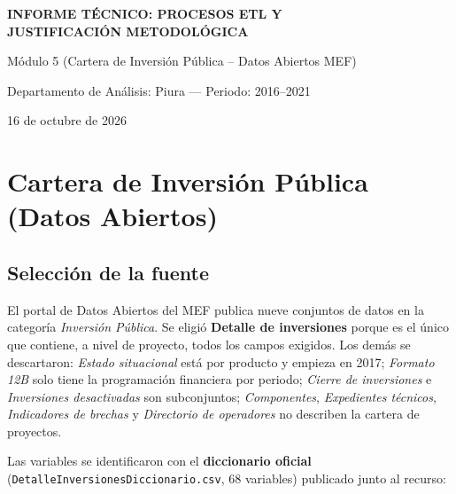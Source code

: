 \documentclass[12pt,a4paper]{article}
\newcommand{\var}[1]{{\renewcommand{\_}{\textunderscore\allowbreak}\texttt{#1}}}
\begin{document}
\begin{center}
  {\Large\bfseries INFORME TÉCNICO: PROCESOS ETL Y\\[3pt] JUSTIFICACIÓN METODOLÓGICA\par}
  \vspace{6pt}
  {\large Módulo 5 (Cartera de Inversión Pública -- Datos Abiertos MEF)\par}
  \vspace{14pt}
  Departamento de Análisis: Piura \qquad --- \qquad Periodo: 2016--2021\par
  \vspace{10pt}
  16 de octubre de 2026
\end{center}
\vspace{10pt}

\section{Cartera de Inversión Pública (Datos Abiertos)}

\subsection{Selección de la fuente}

El portal de Datos Abiertos del MEF publica nueve conjuntos de datos en la categoría
\emph{Inversión Pública}. Se eligió \textbf{Detalle de inversiones} porque es el único que
contiene, a nivel de proyecto, todos los campos exigidos. Los demás se descartaron:
\emph{Estado situacional} está por producto y empieza en 2017; \emph{Formato 12B} solo
tiene la programación financiera por periodo; \emph{Cierre de inversiones} e
\emph{Inversiones desactivadas} son subconjuntos; \emph{Componentes}, \emph{Expedientes
técnicos}, \emph{Indicadores de brechas} y \emph{Directorio de operadores} no describen la
cartera de proyectos.

Las variables se identificaron con el \textbf{diccionario oficial}
(\var{Detalle\_Inversiones\_Diccionario.csv}, 68 variables) publicado junto al recurso:
\end{document}
